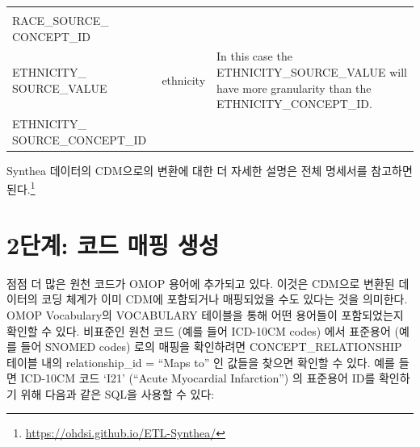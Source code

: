\documentclass[11pt]{book}
\let\rmarkdownfootnote\footnote%
\def\footnote{\protect\rmarkdownfootnote}
\theoremstyle{definition}
\theoremstyle{definition}
\theoremstyle{definition}
\theoremstyle{remark}
\begin{document}
\begin{longtable}[]{@{}lll@{}}
\begin{minipage}[t]{0.50\columnwidth}
\strut
\end{minipage}\tabularnewline
\begin{minipage}[t]{0.28\columnwidth}\raggedright\strut
RACE\_SOURCE\_ CONCEPT\_ID\strut
\end{minipage} & \begin{minipage}[t]{0.13\columnwidth}\raggedright\strut
\strut
\end{minipage} & \begin{minipage}[t]{0.50\columnwidth}\raggedright\strut
\strut
\end{minipage}\tabularnewline
\begin{minipage}[t]{0.28\columnwidth}\raggedright\strut
ETHNICITY\_ SOURCE\_VALUE\strut
\end{minipage} & \begin{minipage}[t]{0.13\columnwidth}\raggedright\strut
ethnicity\strut
\end{minipage} & \begin{minipage}[t]{0.50\columnwidth}\raggedright\strut
In this case the ETHNICITY\_SOURCE\_VALUE will have more granularity
than the ETHNICITY\_CONCEPT\_ID.\strut
\end{minipage}\tabularnewline
\begin{minipage}[t]{0.28\columnwidth}\raggedright\strut
ETHNICITY\_ SOURCE\_CONCEPT\_ID\strut
\end{minipage} & \begin{minipage}[t]{0.13\columnwidth}\raggedright\strut
\strut
\end{minipage} & \begin{minipage}[t]{0.50\columnwidth}\raggedright\strut
\strut
\end{minipage}\tabularnewline
\bottomrule
\end{longtable}

Synthea 데이터의 CDM으로의 변환에 대한 더 자세한 설명은 전체 명세서를
참고하면 된다.\footnote{\url{https://ohdsi.github.io/ETL-Synthea/}}

\section{2단계: 코드 매핑 생성}\label{---}

점점 더 많은 원천 코드가 OMOP 용어에 추가되고 있다. 이것은 CDM으로
변환된 데이터의 코딩 체계가 이미 CDM에 포함되거나 매핑되었을 수도 있다는
것을 의미한다. OMOP Vocabulary의 VOCABULARY 테이블을 통해 어떤 용어들이
포함되었는지 확인할 수 있다. 비표준인 원천 코드 (예를 들어 ICD-10CM
codes) 에서 표준용어 (예를 들어 SNOMED codes) 로의 매핑을 확인하려면
CONCEPT\_RELATIONSHIP 테이블 내의 relationship\_id = ``Maps to'' 인
값들을 찾으면 확인할 수 있다. 예를 들면 ICD-10CM 코드 `I21' (``Acute
Myocardial Infarction'') 의 표준용어 ID를 확인하기 위해 다음과 같은
SQL을 사용할 수 있다:
\end{document}
